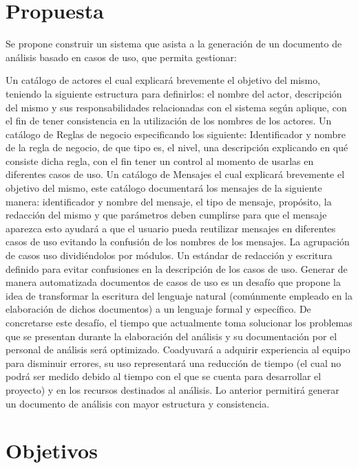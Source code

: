 \section{Propuesta}

	Se propone construir un sistema que asista a la generación de un documento de análisis basado en casos de uso,  que permita gestionar:
	
	Un catálogo de actores el cual explicará brevemente el objetivo del mismo, teniendo la siguiente estructura para definirlos: el nombre del actor, descripción del mismo y sus responsabilidades relacionadas con el sistema según aplique, con el fin de tener consistencia en la utilización de los nombres de los actores.
	Un catálogo de Reglas de negocio especificando los siguiente: Identificador y nombre de la regla de negocio, de que tipo es, el nivel, una descripción explicando en qué consiste dicha regla, con el fin tener un control al momento de usarlas en diferentes casos de uso.
	Un catálogo de Mensajes el cual explicará brevemente el objetivo del mismo, este catálogo documentará los mensajes de la siguiente manera: identificador y nombre del mensaje, el tipo de mensaje, propósito, la redacción del mismo y que parámetros deben cumplirse para que el mensaje aparezca esto ayudará a que el usuario pueda reutilizar mensajes en diferentes casos de uso evitando la confusión de los nombres de los mensajes.
	La agrupación de casos uso dividiéndolos por módulos.
	Un estándar de redacción y escritura definido para evitar confusiones en la descripción de los casos de uso.
	Generar de manera automatizada documentos de casos de uso es un desafío que propone la idea de transformar la escritura del lenguaje natural (comúnmente empleado en la elaboración de dichos documentos) a un lenguaje formal y específico. De concretarse este desafío, el tiempo que actualmente toma solucionar los problemas que se presentan durante la elaboración del análisis y su documentación por el  personal de análisis será optimizado. Coadyuvará a adquirir experiencia al equipo para  disminuir errores, su uso representará una reducción de tiempo (el cual no podrá ser medido debido al tiempo con el que se cuenta para desarrollar el proyecto)  y en los recursos destinados al análisis. Lo anterior permitirá generar un documento de análisis  con mayor estructura y consistencia.
	

\section{Objetivos}
